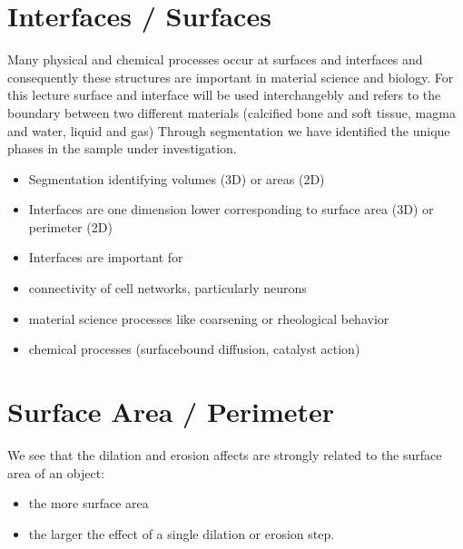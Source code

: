 \documentclass[letterpaper,10pt,english]{sphinxmanual}
\begin{document}
\chapter{Interfaces / Surfaces}
\label{\detokenize{06-AdvancedShapeAndTexture:interfaces-surfaces}}
\sphinxAtStartPar
Many physical and chemical processes occur at surfaces and interfaces and consequently these structures are important in material science and biology. For this lecture surface and interface will be used interchangebly and refers to the boundary between two different materials (calcified bone and soft tissue, magma and water, liquid and gas) Through segmentation we have identified the unique phases in the sample under investigation.
\begin{itemize}
\item {} 
\sphinxAtStartPar
Segmentation identifying volumes (3D) or areas (2D)

\item {} 
\sphinxAtStartPar
Interfaces are one dimension lower corresponding to surface area (3D) or perimeter (2D)

\item {} 
\sphinxAtStartPar
Interfaces are important for

\item {} 
\sphinxAtStartPar
connectivity of cell networks, particularly neurons

\item {} 
\sphinxAtStartPar
material science processes like coarsening or rheological behavior

\item {} 
\sphinxAtStartPar
chemical processes (surface\sphinxhyphen{}bound diffusion, catalyst action)

\end{itemize}


\chapter{Surface Area / Perimeter}
\label{\detokenize{06-AdvancedShapeAndTexture:surface-area-perimeter}}
\sphinxAtStartPar
We see that the dilation and erosion affects are strongly related to the surface area of an object:
\begin{itemize}
\item {} 
\sphinxAtStartPar
the more surface area

\item {} 
\sphinxAtStartPar
the larger the effect of a single dilation or erosion step.

\end{itemize}
\end{document}
